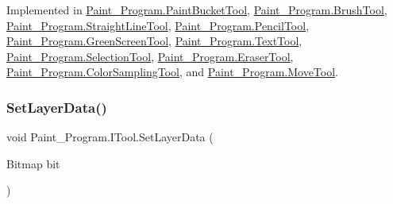 Implemented in \mbox{\hyperlink{class_paint___program_1_1_paint_bucket_tool_a634df2c5ddde570dc6c73abe5c680266}{Paint\+\_\+\+Program.\+Paint\+Bucket\+Tool}}, \mbox{\hyperlink{class_paint___program_1_1_brush_tool_ae96d027fe5ef110b5b00802a2d842a15}{Paint\+\_\+\+Program.\+Brush\+Tool}}, \mbox{\hyperlink{class_paint___program_1_1_straight_line_tool_a27d923f2b23fbfa5e630af6d43c5e613}{Paint\+\_\+\+Program.\+Straight\+Line\+Tool}}, \mbox{\hyperlink{class_paint___program_1_1_pencil_tool_ae41c314454969364d7bdf85e584faf46}{Paint\+\_\+\+Program.\+Pencil\+Tool}}, \mbox{\hyperlink{class_paint___program_1_1_green_screen_tool_a554c35de10b5876aa936961177344a59}{Paint\+\_\+\+Program.\+Green\+Screen\+Tool}}, \mbox{\hyperlink{class_paint___program_1_1_text_tool_a6fdb8fac7060beb3677489c709a7913f}{Paint\+\_\+\+Program.\+Text\+Tool}}, \mbox{\hyperlink{class_paint___program_1_1_selection_tool_a3e97ebc6bc62f194b42e2acdd24a498f}{Paint\+\_\+\+Program.\+Selection\+Tool}}, \mbox{\hyperlink{class_paint___program_1_1_eraser_tool_a2cc4463cfa0525b3687bb227204eaa05}{Paint\+\_\+\+Program.\+Eraser\+Tool}}, \mbox{\hyperlink{class_paint___program_1_1_color_sampling_tool_a68b28bfa791d073d5042b925261b6417}{Paint\+\_\+\+Program.\+Color\+Sampling\+Tool}}, and \mbox{\hyperlink{class_paint___program_1_1_move_tool_ad2ef8810a173274af16797143eae1d79}{Paint\+\_\+\+Program.\+Move\+Tool}}.

\mbox{\label{interface_paint___program_1_1_i_tool_a2d3e63715dfe04075d27dacf367d1633}} 
\subsubsection{\texorpdfstring{Set\+Layer\+Data()}{SetLayerData()}}
{\footnotesize\ttfamily void Paint\+\_\+\+Program.\+I\+Tool.\+Set\+Layer\+Data (\begin{DoxyParamCaption}\item[{Bitmap}]{bit }\end{DoxyParamCaption})}




